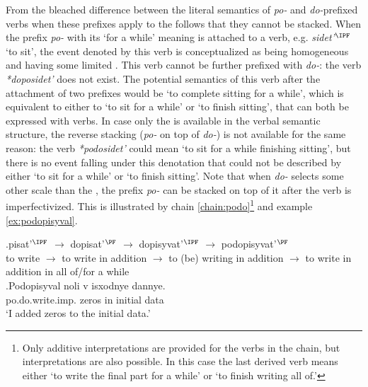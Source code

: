 From the bleached difference between the literal semantics of \textit{po-} and \textit{do-}prefixed verbs when these prefixes apply to the  follows that they cannot be stacked. When the prefix \textit{po-} with its `for a while' meaning is attached to a verb, e.g. \textit{sidet'}$^{\IPF}$ `to sit', the event denoted by this verb is conceptualized as being homogeneous and having some limited . This verb cannot be further prefixed with \textit{do-}: the verb \textit{*doposidet'} does not exist. The potential semantics of this verb after the attachment of two prefixes would be `to complete sitting for a while', which is equivalent to either to `to sit for a while' or `to finish sitting', that can both be expressed with  verbs. In case only the  is available in the verbal semantic structure, the reverse stacking (\textit{po-} on top of \textit{do-}) is not available for the same reason: the verb \textit{*podosidet'} could mean `to sit for a while finishing sitting', but there is no event falling under this denotation that could not be described by either `to sit for a while' or `to finish sitting'. Note that when \textit{do-} selects some other scale than the , the prefix \textit{po-} can be stacked on top of it after the verb is imperfectivized. This is illustrated by chain \ref{chain:podo}\footnote{Only additive interpretations are provided for the verbs in the chain, but  interpretations are also possible. In this case the last derived verb means either `to write the final part for a while' or `to finish writing all of.'} and example \ref{ex:podopisyval}.

\exg.\label{chain:podo}pisat'$^{\IPF}$ $\rightarrow$ dopisat'$^{\PF}$ $\rightarrow$ dopisyvat'$^{\IPF}$ $\rightarrow$ podopisyvat'$^{\PF}$\\
{to write} $\rightarrow$ {to write in addition} $\rightarrow$ {to (be) writing in addition} $\rightarrow$ {to write in addition in all of/for a while}\\

\exg.\label{ex:podopisyval}Podopisyval noli v isxodnye dannye.\\
po.do.write.imp. zeros in initial data\\
\trans `I added zeros to the initial data.'

